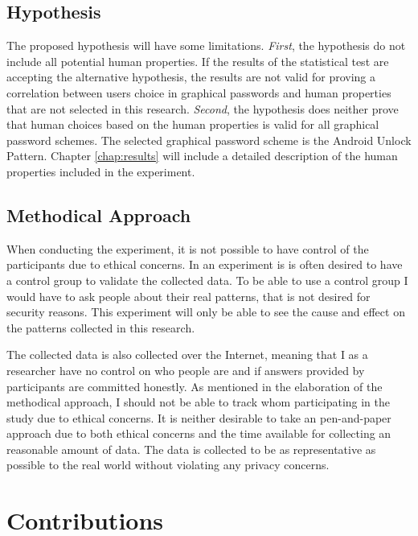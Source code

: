 		\subsection{Hypothesis}
	  	The proposed hypothesis will have some limitations. {\it First}, the hypothesis do not include all potential human properties. If the results of the statistical test are accepting the alternative hypothesis, the results are not valid for proving a correlation between users choice in graphical passwords and human properties that are not selected in this research. {\it Second}, the hypothesis does neither prove that human choices based on the human properties is valid for all graphical password schemes. The selected graphical password scheme is the Android Unlock Pattern. Chapter \ref{chap:results} will include a detailed description of the human properties included in the experiment.

	  \subsection{Methodical Approach}
	  	When conducting the experiment, it is not possible to have control of the participants due to ethical concerns. In an experiment is is often desired to have a control group to validate the collected data. To be able to use a control group I would have to ask people about their real patterns, that is not desired for security reasons. This experiment will only be able to see the cause and effect on the patterns collected in this research.

	  	The collected data is also collected over the Internet, meaning that I as a researcher have no control on who people are and if answers provided by participants are committed honestly. As mentioned in the elaboration of the methodical approach, I should not be able to track whom participating in the study due to ethical concerns. It is neither desirable to take an pen-and-paper approach due to both ethical concerns and the time available for collecting an reasonable amount of data. The data is collected to be as representative as possible to the real world without violating any privacy concerns. 
	
	\section{Contributions} \label{sec:contributions}

